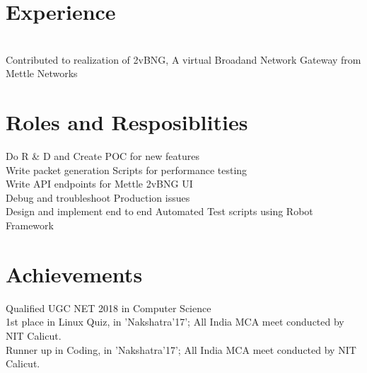 \documentclass[11pt]{hieudo-build}
\begin{document}
\begin{minipage}[t]{0.65\textwidth} 
\section{Experience}

 \\
 Contributed to realization of 2vBNG, A virtual Broadand Network Gateway from Mettle Networks\\
\sectionsep
\section{Roles and Resposiblities} 
\textbullet{} Do R \& D and Create POC for new features \\
\textbullet {} Write packet generation Scripts for performance testing \\
\textbullet {} Write API endpoints for Mettle 2vBNG UI \\
\textbullet {} Debug and troubleshoot Production issues \\
\textbullet {} Design and implement end to end Automated Test scripts using Robot Framework
\sectionsep
 \section{Achievements}
 \textbullet{} Qualified UGC NET 2018 in Computer Science \\
 \textbullet{} 1st place in Linux Quiz,
 in 'Nakshatra'17'; All India  MCA meet conducted by NIT Calicut.\\
 \textbullet{} Runner up in Coding, in 'Nakshatra'17'; All India 
 MCA meet conducted by NIT Calicut. 
 



\end{minipage}
\end{document}
